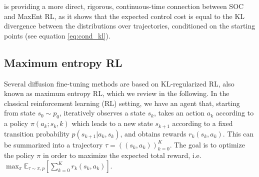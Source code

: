  is providing a more direct, rigorous, continuous-time connection between SOC and MaxEnt RL, as it shows that the expected control cost is equal to the KL divergence between the distributions over trajectories, conditioned on the starting points (see equation \eqref{eq:cond_kl}). 

\subsection{Maximum entropy RL}
Several diffusion fine-tuning methods \citep{black2024training,uehara2024finetuning} are based on KL-regularized RL, also known as maximum entropy RL, which we review in the following.
In the classical reinforcement learning (RL) setting, we have an agent that, starting from state $s_0 \sim p_0$, iteratively observes a state $s_k$, takes an action $a_k$ according to a policy $\pi(a_k;s_k,k)$ which leads to a new state $s_{k+1}$ according to a fixed transition probability $p(s_{k+1}|a_k,s_k)$, and obtains rewards $r_k(s_k,a_k)$. 
This can be summarized into a trajectory $\tau = ((s_k,a_k))_{k=0}^{K}$. 
The goal is to optimize the policy $\pi$ in order to maximize the expected total reward, i.e. $\max_{\pi} \mathbb{E}_{\tau \sim \pi,p} [\sum_{k=0}^{K} r_k(s_k,a_k)
]$. 


